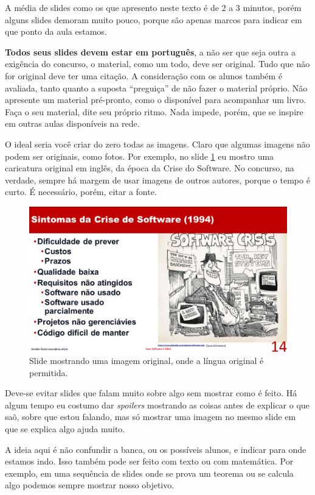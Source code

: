 \documentclass{article}
\def\tam{0.6}
\begin{document}
A média de slides como os que apresento neste texto é de 2 a 3 minutos, porém alguns slides demoram muito pouco, porque são apenas marcos para indicar em que ponto da aula estamos.

\textbf{Todos seus slides devem estar em português}, a não ser que seja outra a exigência do concurso, o material, como um todo, deve ser original. Tudo que não for original deve ter uma citação. A consideração com os alunos também é avaliada, tanto quanto a suposta ``preguiça'' de não fazer o material próprio. Não apresente um material pré-pronto, como o disponível para acompanhar um livro. Faça o seu material, dite seu próprio ritmo. Nada impede, porém, que se inspire em outras aulas disponíveis na rede.

O ideal seria você criar do zero todas as imagens. Claro que algumas imagens não podem ser originais, como fotos. Por exemplo, no slide \ref{fig:crisis} eu mostro uma caricatura original em inglês, da época da Crise do Software. No concurso, na verdade, sempre há  margem de usar imagens de outros autores, porque o tempo é curto. É necessário, porém, citar a fonte.

\begin{figure}[!htb]
    \centering
    \includegraphics[width=\tam\linewidth]{imagens/crisis.png}
    \caption{Slide mostrando uma imagem original, onde a língua original é permitida.}
    \label{fig:crisis}
\end{figure}

Deve-se evitar slides que falam muito sobre algo sem mostrar como é feito. Há algum tempo eu costumo dar \textit{spoilers} mostrando as coisas antes de explicar o que saõ, sobre que estou falando, mas só mostrar uma imagem no mesmo slide em que se explica algo ajuda muito. 

A ideia aqui é não confundir a banca, ou os possíveis alunos, e indicar para onde estamos indo. Isso também pode ser feito com texto ou com matemática. Por exemplo, em uma sequência de slides onde se prova um teorema ou se calcula algo podemos sempre mostrar nosso objetivo.
\end{document}
